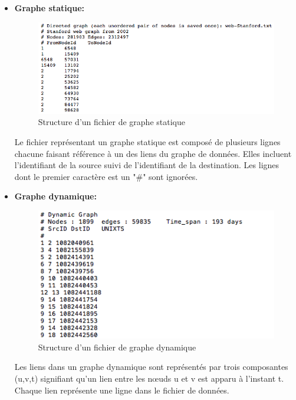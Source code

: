 	\begin{itemize}[label=$\bullet$]
	\item \textbf{Graphe statique:}
	
	\begin{figure}[H]
	\centering
	
	\includegraphics[scale=0.65]{ressources/image/statiqugr.png}
	\caption{Structure d'un fichier de graphe statique}
	\label{Img:statiqugr}
 \end{figure}
	
	Le fichier représentant un graphe statique est composé de plusieurs lignes chacune faisant référence à un des liens du graphe de données. Elles incluent l'identifiant de la source suivi de  l'identifiant de la destination. Les lignes dont le premier caractère est un "\#" sont ignorées.
	\item \textbf{Graphe dynamique: } 
	
	\begin{figure}[H]
	
	
	\includegraphics[scale=0.7]{ressources/image/dynamiqgr.png}
	\caption{Structure d'un fichier de graphe dynamique}
	\label{Img:dynamiqgr}
 \end{figure}
Les liens dans un graphe dynamique sont représentés par trois composantes (u,v,t)	signifiant qu'un lien entre les nœuds u et v est apparu à l'instant t. Chaque lien représente une ligne dans le fichier de données.
	

\end{itemize}
